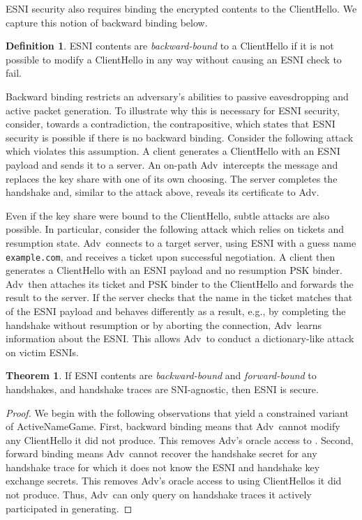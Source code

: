 \documentclass{article}
\theoremstyle{definition}
\newtheorem{theorem}{Theorem}[section]
\newcommand{\adv}{{\sf Adv}}
\theoremstyle{definition}
\newtheorem{definition}{Definition}[section]
\begin{document}
ESNI security also requires binding the encrypted contents to the ClientHello. We capture this 
notion of backward binding below.

\begin{definition}
ESNI contents are \emph{backward-bound} to a ClientHello if it is not possible to modify a ClientHello in 
any way without causing an ESNI check to fail.
\end{definition}

Backward binding restricts an adversary's abilities to passive eavesdropping and active packet generation.
To illustrate why this is necessary for ESNI security, consider, towards a contradiction, the contrapositive,
which states that ESNI security is possible if there is no backward binding. Consider the following attack
which violates this assumption. A client generates a ClientHello with an ESNI payload and sends it to a server.
An on-path \adv\ intercepts the message and replaces the key share with one of its own choosing. The server
completes the handshake and, similar to the attack above, reveals its certificate to \adv. 

Even if the key share were bound to the ClientHello, subtle attacks are also possible. In particular, consider
the following attack which relies on tickets and resumption state. \adv\ connects to a target server, using ESNI 
with a guess name {\tt example.com}, and receives a ticket upon successful negotiation. A client then
generates a ClientHello with an ESNI payload and no resumption PSK binder. \adv\ then attaches its ticket and 
PSK binder to the ClientHello and forwards the result to the server. If the server checks that the name in 
the ticket matches that of the ESNI payload and behaves differently as a result, e.g., by completing the handshake
without resumption or by aborting the connection, \adv\ learns information about the ESNI. This allows \adv\ to
conduct a dictionary-like attack on victim ESNIs.

\begin{theorem}
If ESNI contents are \emph{backward-bound} and \emph{forward-bound} to handshakes, and handshake traces are SNI-agnostic,
then ESNI is secure.
\end{theorem}

\begin{proof}
We begin with the following observations that yield a constrained variant of {\sf ActiveNameGame}. 
First, backward binding means that \adv\ cannot modify any ClientHello it did not produce. 
This removes \adv's oracle access to . Second, forward binding means 
\adv\ cannot recover the handshake secret for any handshake trace for which it does not know the ESNI and handshake 
key exchange secrets. This removes \adv's oracle access to  using ClientHellos it did not produce.
Thus, \adv\ can only query  on handshake traces it actively participated in generating.
\end{proof}
\end{document}
